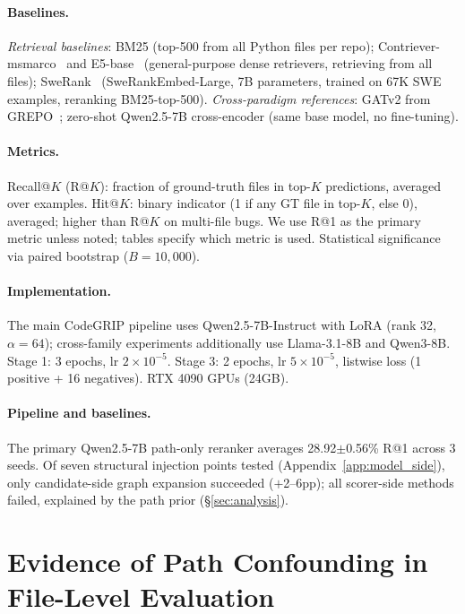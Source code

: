 \documentclass{article}
\begin{document}
\paragraph{Baselines.}
\emph{Retrieval baselines}: BM25 (top-500 from all Python files per repo); Contriever-msmarco~\citep{izacard2022unsupervised} and E5-base~\citep{wang2022text} (general-purpose dense retrievers, retrieving from all files); SweRank~\citep{reddy2025swerank} (SweRankEmbed-Large, 7B parameters, trained on 67K SWE examples, reranking BM25-top-500).
\emph{Cross-paradigm references}: GATv2 from GREPO~\citep{wang2026grepo}; zero-shot Qwen2.5-7B cross-encoder (same base model, no fine-tuning).

\paragraph{Metrics.}
Recall@$K$ (R@$K$): fraction of ground-truth files in top-$K$ predictions, averaged over examples.
Hit@$K$: binary indicator (1 if any GT file in top-$K$, else 0), averaged; higher than R@$K$ on multi-file bugs.
We use R@1 as the primary metric unless noted; tables specify which metric is used.
Statistical significance via paired bootstrap ($B = 10{,}000$).

\paragraph{Implementation.}
The main CodeGRIP pipeline uses Qwen2.5-7B-Instruct with LoRA (rank 32, $\alpha = 64$); cross-family experiments additionally use Llama-3.1-8B and Qwen3-8B.
Stage 1: 3 epochs, lr $2 \times 10^{-5}$.
Stage 3: 2 epochs, lr $5 \times 10^{-5}$, listwise loss (1 positive + 16 negatives).
RTX 4090 GPUs (24GB).


\paragraph{Pipeline and baselines.}
\label{sec:overview}
\label{sec:expansion}
\label{sec:main_results}
The primary Qwen2.5-7B path-only reranker averages 28.92$\pm$0.56\% R@1 across 3 seeds.
Of seven structural injection points tested (Appendix~\ref{app:model_side}), only candidate-side graph expansion succeeded ($+$2--6pp); all scorer-side methods failed, explained by the path prior (\S\ref{sec:analysis}).


\section{Evidence of Path Confounding in File-Level Evaluation}
\label{sec:path_analysis}
\label{sec:analysis}
\end{document}
